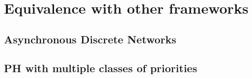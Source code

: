 \section{ Equivalence with other frameworks}

\subsection{Asynchronous Discrete Networks}

\subsection{PH with multiple classes of priorities}
